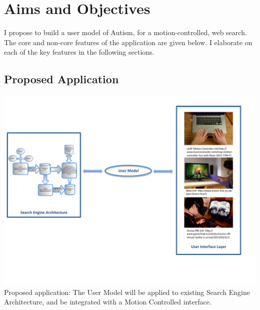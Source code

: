 \documentclass[a4paper, 10pt]{article}
\begin{document}
\section{Aims and Objectives} 
I propose to build a user model of Autism, for a motion-controlled, web search. The core and non-core features of the application are given below. I elaborate on each of the key features in the following sections. 

\subsection{Proposed Application}\label{proposed}
\begin{center}
\includegraphics[scale=0.6]{searchEngArchi}\\
Proposed application: The User Model will be applied to existing Search Engine Architecture\cite{seimage}, and be integrated with a Motion Controlled interface.
\end{center}
\end{document}
